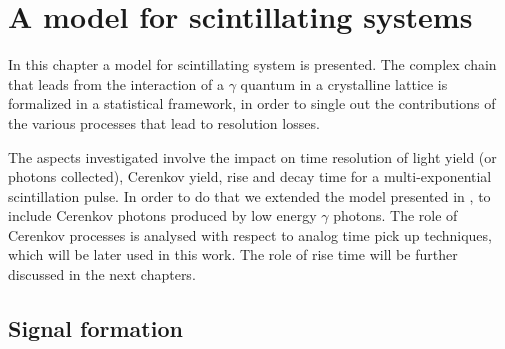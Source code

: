 \chapter{A model for scintillating systems}

In this chapter a model for scintillating system is presented. 
The complex chain that leads from the interaction of a $\gamma$ quantum in a crystalline lattice is formalized in a statistical framework, in order to single out the contributions of the various processes that lead to resolution losses.

The aspects investigated involve the impact on time resolution of light yield (or photons collected), Cerenkov yield, rise and decay time for a multi-exponential scintillation pulse.
In order to do that we extended the model presented in \cite{Seifert2012}, to include Cerenkov photons produced by low energy $\gamma$ photons.
The role of Cerenkov processes is analysed with respect to analog time pick up techniques, which will be later used in this work. The role of rise time will be further discussed in the next chapters.

\section{Signal formation}

